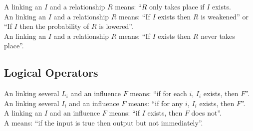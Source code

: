 \noindent
A  linking an  $I$ and a relationship $R$ means: ``$R$ only takes place if $I$ exists. 
\\[\baselineskip]

\noindent
An  linking an  $I$ and a relationship $R$ means: ``If $I$ exists then $R$ is weakened'' or ``If $I$ then the probability of $R$ is lowered''. 
\\[\baselineskip]

\noindent
An  linking an  $I$ and a relationship $R$ means: ``If $I$ exists then $R$ never takes place''. 
\\[\baselineskip]

\subsection{Logical Operators}

An  linking several  $L_i$ and an influence $F$ means: ``if for each $i$, $I_i$ exists, then $F$''.\\[\baselineskip]

\noindent
An  linking several  $I_i$ and an influence $F$ means: ``if for any $i$, $I_i$ exists, then $F$''.\\[\baselineskip]

\noindent
A  linking an  $I$ and an influence $F$ means: ``if $I$ exists, then $F$ does not''.\\[\baselineskip]

\noindent
A  means: ``if the input is true then output but not immediately''.\\[\baselineskip]


\normalcolor

